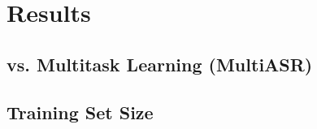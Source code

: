 \section{Results}
\label{sec:results}

\subsection{vs. Multitask Learning (MultiASR)}
\label{ssec:baseline-multitask}

%

\subsection{Training Set Size}
\label{ssec:training-size}

